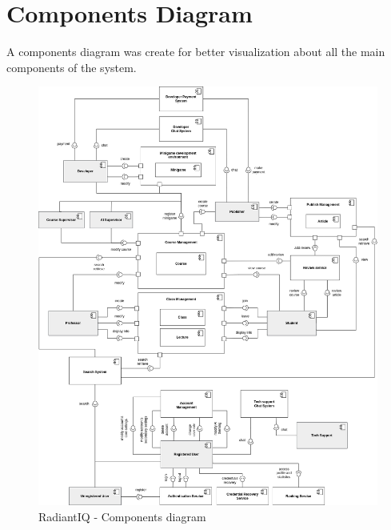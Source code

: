 \section{Components Diagram} \label{components-diagram}

A components diagram was create for better visualization about all the main components of the system.

\begin{figure}[h]
	\centering
	\includegraphics[width=0.9\linewidth]{images/components-diagram.png}
	\caption{RadiantIQ - Components diagram}
	\label{fig:components-diagram}
\end{figure}